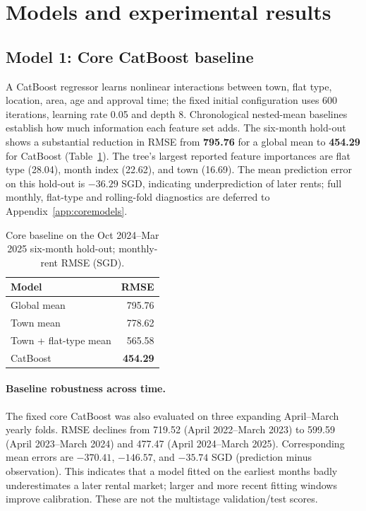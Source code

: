 \documentclass[10pt,a4paper]{article}
\begin{document}
\section{Models and experimental results}\label{sec:models}
\subsection{Model 1: Core CatBoost baseline}\label{sec:m1}
A CatBoost regressor learns nonlinear interactions between town, flat type, location, area, age and approval time; the fixed initial configuration uses 600 iterations, learning rate 0.05 and depth 8. Chronological nested-mean baselines establish how much information each feature set adds. The six-month hold-out shows a substantial reduction in RMSE from \textbf{795.76} for a global mean to \textbf{454.29} for CatBoost (Table~\ref{tab:coremain}). The tree's largest reported feature importances are flat type (28.04), month index (22.62), and town (16.69). The mean prediction error on this hold-out is $-36.29$ SGD, indicating underprediction of later rents; full monthly, flat-type and rolling-fold diagnostics are deferred to Appendix~\ref{app:coremodels}.
\begin{table}[htbp]\centering\small
\caption{Core baseline on the Oct 2024--Mar 2025 six-month hold-out; monthly-rent RMSE (SGD).}\label{tab:coremain}
\begin{tabular}{lr}\toprule Model & RMSE\\\midrule
Global mean & 795.76\\Town mean & 778.62\\Town + flat-type mean & 565.58\\CatBoost & \textbf{454.29}\\\bottomrule\end{tabular}\end{table}


\paragraph{Baseline robustness across time.}
The fixed core CatBoost was also evaluated on three expanding April--March yearly folds. RMSE declines from 719.52 (April 2022--March 2023) to 599.59 (April 2023--March 2024) and 477.47 (April 2024--March 2025). Corresponding mean errors are $-370.41$, $-146.57$, and $-35.74$ SGD (prediction minus observation). This indicates that a model fitted on the earliest months badly underestimates a later rental market; larger and more recent fitting windows improve calibration. These are not the multistage validation/test scores.
\end{document}
